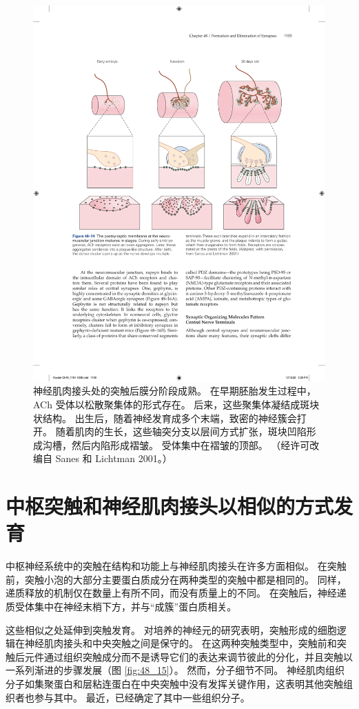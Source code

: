 \begin{figure}[htbp]
	\centering
	\includegraphics[width=0.9\linewidth]{chap48/fig_48_14}
	\caption{神经肌肉接头处的突触后膜分阶段成熟。 在早期胚胎发生过程中，ACh 受体以松散聚集体的形式存在。 后来，这些聚集体凝结成斑块状结构。 出生后，随着神经发育成多个末端，致密的神经簇会打开。 随着肌肉的生长，这些轴突分支以层间方式扩张，斑块凹陷形成沟槽，然后内陷形成褶皱。 受体集中在褶皱的顶部。 （经许可改编自 Sanes 和 Lichtman 2001。）}
	\label{fig:48_14}
\end{figure}


\section{中枢突触和神经肌肉接头以相似的方式发育}
中枢神经系统中的突触在结构和功能上与神经肌肉接头在许多方面相似。 在突触前，突触小泡的大部分主要蛋白质成分在两种类型的突触中都是相同的。 同样，递质释放的机制仅在数量上有所不同，而没有质量上的不同。 在突触后，神经递质受体集中在神经末梢下方，并与“成簇”蛋白质相关。

这些相似之处延伸到突触发育。 对培养的神经元的研究表明，突触形成的细胞逻辑在神经肌肉接头和中央突触之间是保守的。 
在这两种突触类型中，突触前和突触后元件通过组织突触成分而不是诱导它们的表达来调节彼此的分化，并且突触以一系列渐进的步骤发展（图 \ref{fig:48_15}）。 
然而，分子细节不同。 神经肌肉组织分子如集聚蛋白和层粘连蛋白在中央突触中没有发挥关键作用，这表明其他突触组织者也参与其中。 最近，已经确定了其中一些组织分子。

